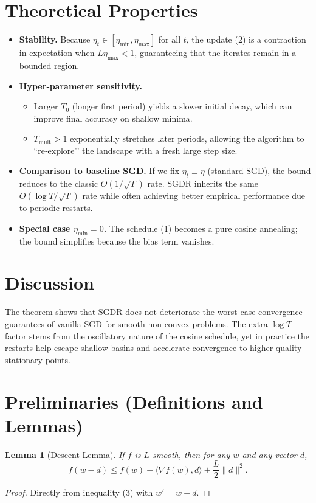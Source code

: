 \documentclass{article}
\newtheorem{lemma}{Lemma}
\begin{document}
\section*{Theoretical Properties}
\begin{itemize}
\item \textbf{Stability.} Because $\eta_t\in[\eta_{\min},\eta_{\max}]$ for all $t$, the update (2) is a contraction in expectation when $L\eta_{\max}<1$, guaranteeing that the iterates remain in a bounded region.
\item \textbf{Hyper‑parameter sensitivity.}
    \begin{itemize}
        \item Larger $T_0$ (longer first period) yields a slower initial decay, which can improve final accuracy on shallow minima.
        \item $T_{\text{mult}}>1$ exponentially stretches later periods, allowing the algorithm to “re‑explore’’ the landscape with a fresh large step size.
    \end{itemize}
\item \textbf{Comparison to baseline SGD.}  
If we fix $\eta_t\equiv\eta$ (standard SGD), the bound reduces to the classic $O(1/\sqrt{T})$ rate. SGDR inherits the same $O(\log T/\sqrt{T})$ rate while often achieving better empirical performance due to periodic restarts.
\item \textbf{Special case $\eta_{\min}=0$.} The schedule (1) becomes a pure cosine annealing; the bound simplifies because the bias term vanishes.
\end{itemize}

\section*{Discussion}
The theorem shows that SGDR does not deteriorate the worst‑case convergence guarantees of vanilla SGD for smooth non‑convex problems. The extra $\log T$ factor stems from the oscillatory nature of the cosine schedule, yet in practice the restarts help escape shallow basins and accelerate convergence to higher‑quality stationary points.

\newpage
\section*{Preliminaries (Definitions and Lemmas)}
\begin{lemma}[Descent Lemma]\label{lem:descent}
If $f$ is $L$‑smooth, then for any $w$ and any vector $d$,
\[
f(w-d)\le f(w)-\langle\nabla f(w),d\rangle+\frac{L}{2}\|d\|^2.
\tag{8}
\]
\end{lemma}
\begin{proof}
Directly from inequality (3) with $w'=w-d$.
\end{proof}
\end{document}
